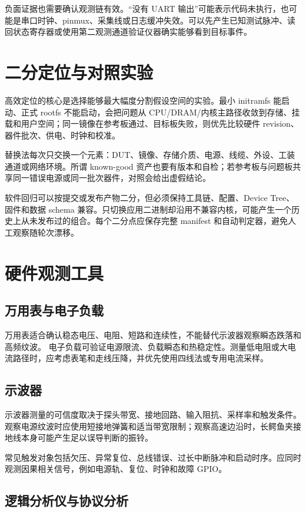 负面证据也需要确认观测链有效。“没有 UART 输出”可能表示代码未执行，也可能是串口时钟、pinmux、采集线或日志缓冲失效。可以先产生已知测试脉冲、读回状态寄存器或使用第二观测通道验证仪器确实能够看到目标事件。

\section{二分定位与对照实验}

高效定位的核心是选择能够最大幅度分割假设空间的实验。最小 initramfs 能启动、正式 rootfs 不能启动，会把问题从 CPU/DRAM/内核主路径收敛到存储、挂载和用户空间；同一镜像在参考板通过、目标板失败，则优先比较硬件 revision、器件批次、供电、时钟和校准。

替换法每次只交换一个元素：DUT、镜像、存储介质、电源、线缆、外设、工装通道或网络环境。所谓 known-good 资产也要有版本和自检；若参考板与问题板共享同一错误电源或同一批次器件，对照会给出虚假结论。

软件回归可以按提交或发布产物二分，但必须保持工具链、配置、Device Tree、固件和数据 schema 兼容。只切换应用二进制却沿用不兼容内核，可能产生一个历史上从未发布过的组合。每个二分点应保存完整 manifest 和自动判定器，避免人工观察随轮次漂移。

\section{硬件观测工具}

\subsection{万用表与电子负载}

万用表适合确认稳态电压、电阻、短路和连续性，不能替代示波器观察瞬态跌落和高频纹波。
电子负载可验证电源限流、负载瞬态和热稳定性。测量低电阻或大电流路径时，应考虑表笔和走线压降，并优先使用四线法或专用电流采样。

\subsection{示波器}

示波器测量的可信度取决于探头带宽、接地回路、输入阻抗、采样率和触发条件。
观察电源纹波时应使用短接地弹簧和适当带宽限制；观察高速边沿时，长鳄鱼夹接地线本身可能产生足以误导判断的振铃。

常见触发对象包括欠压、异常复位、总线错误、过长中断脉冲和启动时序。应同时观测因果相关信号，例如电源轨、复位、时钟和故障 GPIO。

\subsection{逻辑分析仪与协议分析}

